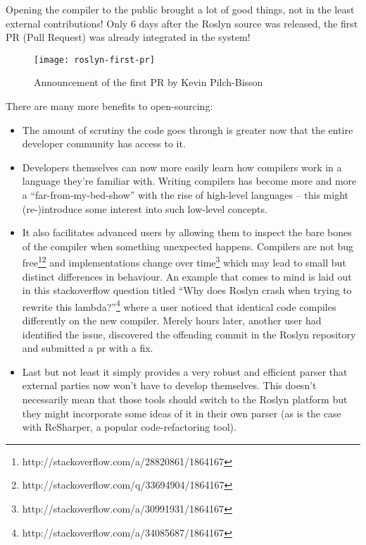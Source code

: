 Opening the \gls{compiler} to the public brought a lot of good things, not in the least external contributions! Only 6 days after the Roslyn source was released, the first PR (Pull Request) was already integrated in the system!

\begin{figure}[h]
\centering
\texttt{[image: roslyn-first-pr]}
\caption[Announcement of the first PR by Kevin Pilch-Bisson]{Announcement of the first PR by Kevin Pilch-Bisson\protect\footnotemark}
\end{figure}


There are many more benefits to open-sourcing:

\begin{itemize}
	\item The amount of scrutiny the code goes through is greater now that the entire developer community has access to it.
	
	\item Developers themselves can now more easily learn how \glspl{compiler} work in a language they’re familiar with. Writing compilers has become more and more a “far-from-my-bed-show” with the rise of high-level languages – this might (re-)introduce some interest into such low-level concepts.
	
	\item It also facilitates advanced users by allowing them to inspect the bare bones of the \gls{compiler} when something unexpected happens. Compilers are not bug free\footnote{http://stackoverflow.com/a/28820861/1864167}\footnote{http://stackoverflow.com/q/33694904/1864167} and implementations change over time\footnote{http://stackoverflow.com/a/30991931/1864167} which may lead to small but distinct differences in behaviour. An example that comes to mind is laid out in this stackoverflow question titled “Why does Roslyn crash when trying to rewrite this lambda?”\footnote{http://stackoverflow.com/a/34085687/1864167} where a user noticed that identical code compiles differently on the new compiler. Merely hours later, another user had identified the issue, discovered the offending commit in the Roslyn repository and submitted a \gls{pr} with a fix.
	
	\item Last but not least it simply provides a very robust and efficient parser that external parties now won’t have to develop themselves. This doesn’t necessarily mean that those tools should switch to the Roslyn platform but they might incorporate some ideas of it in their own \gls{parser} (as is the case with ReSharper, a popular code-refactoring tool).\parencite{Gorohovsky2014}

\end{itemize}


